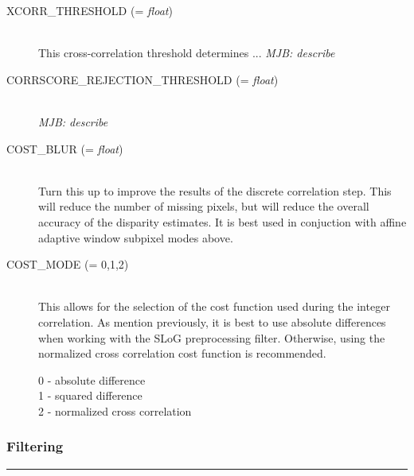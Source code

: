 \begin{description}
\item[XCORR\_THRESHOLD \textnormal{\small{(= \emph{float})}}] \hfill \\ 

  This cross-correlation threshold determines ... \emph{MJB: describe}

\item[CORRSCORE\_REJECTION\_THRESHOLD \textnormal{\small{(= \emph{float})}}] \hfill \\

  \emph{MJB: describe}

\item[COST\_BLUR \textnormal{\small{(= \emph{float})}}] \hfill \\

  Turn this up to improve the results of the discrete correlation step.
  This will reduce the number of missing pixels, but will reduce the
  overall accuracy of the disparity estimates.  It is best used in
  conjuction with affine adaptive window subpixel modes above.

\item[COST\_MODE \textnormal{\small{(= 0,1,2)}}] \hfill \\

  This allows for the selection of the cost function used during the
  integer correlation. As mention previously, it is best to use
  absolute differences when working with the SLoG preprocessing
  filter. Otherwise, using the normalized cross correlation cost
  function is recommended.

  \begin{description}
    \item[0 - absolute difference]
    \item[1 - squared difference]
    \item[2 - normalized cross correlation]
  \end{description}

\end{description}

\subsubsection*{Filtering}
\hrule
\bigskip

